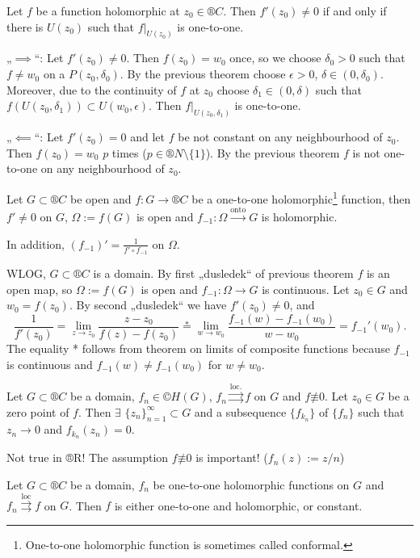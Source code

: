 \documentclass[12pt]{article}					%
\begin{document}
\begin{dusledek}
	Let $f$ be a function holomorphic at $z_0 \in ®C$. Then $f'(z_0) ≠ 0$ if and only if there is $U(z_0)$ such that $f|_{U(z_0)}$ is one-to-one.

	\begin{dukazin}
		„$\implies$“: Let $f'(z_0) ≠ 0$. Then $f(z_0) = w_0$ once, so we choose $\delta_0 > 0$ such that $f ≠ w_0$ on a $P(z_0, \delta_0)$. By the previous theorem choose $\epsilon > 0$, $\delta \in (0, \delta_0)$. Moreover, due to the continuity of $f$ at $z_0$ choose $\delta_1 \in (0, \delta)$ such that $f(U(z_0, \delta_1)) \subset U(w_0, \epsilon)$. Then $f|_{U(z_0, \delta_1)}$ is one-to-one.

		„$\impliedby$“: Let $f'(z_0) = 0$ and let $f$ be not constant on any neighbourhood of $z_0$. Then $f(z_0) = w_0$ $p$ times ($p \in ®N \setminus \{1\}$). By the previous theorem $f$ is not one-to-one on any neighbourhood of $z_0$.
	\end{dukazin}
\end{dusledek}

\begin{veta}
	Let $G \subset ®C$ be open and $f: G \rightarrow ®C$ be a one-to-one holomorphic\footnote{One-to-one holomorphic function is sometimes called conformal.} function, then $f' ≠ 0$ on $G$, $\Omega := f(G)$ is open and $f_{-1}: \Omega \overset{\text{onto}}\rightarrow G$ is holomorphic.

	In addition, $(f_{-1})' = \frac{1}{f' \circ f_{-1}}$ on $\Omega$.

	\begin{dukazin}
		WLOG, $G \subset ®C$ is a domain. By first „dusledek“ of previous theorem $f$ is an open map, so $\Omega := f(G)$ is open and $f_{-1}: \Omega \rightarrow G$ is continuous. Let $z_0 \in G$ and $w_0 = f(z_0)$. By second „dusledek“ we have $f'(z_0) ≠ 0$, and
		$$ \frac{1}{f'(z_0)} = \lim_{z \rightarrow z_0} \frac{z - z_0}{f(z) - f(z_0)} \overset*= \lim_{w \rightarrow w_0} \frac{f_{-1}(w) - f_{-1}(w_0)}{w - w_0} = f_{-1}'(w_0). $$
		The equality * follows from theorem on limits of composite functions because $f_{-1}$ is continuous and $f_{-1}(w) ≠ f_{-1}(w_0)$ for $w ≠ w_0$.
	\end{dukazin}
\end{veta}

\begin{veta}[Hurwitz]
	Let $G \subset ®C$ be a domain, $f_n \in ©H(G)$, $f_n \overset{\text{loc.}}\rightrightarrows f$ on $G$ and $f \not≡ 0$. Let $z_0 \in G$ be a zero point of $f$. Then $\exists$ $\{z_n\}_{n = 1}^∞ \subset G$ and a subsequence $\{f_{k_n}\}$ of $\{f_n\}$ such that $z_n \rightarrow 0$ and $f_{k_n}(z_n) = 0$.

	\begin{poznamkain}
		Not true in ®R! The assumption $f \not≡ 0$ is important! ($f_n(z) := z/n$)
	\end{poznamkain}
\end{veta}

\begin{dusledek}
	Let $G \subset ®C$ be a domain, $f_n$ be one-to-one holomorphic functions on $G$ and $f_n \overset{\text{loc}}\rightrightarrows f$ on $G$. Then $f$ is either one-to-one and holomorphic, or constant.
\end{dusledek}
\end{document}
